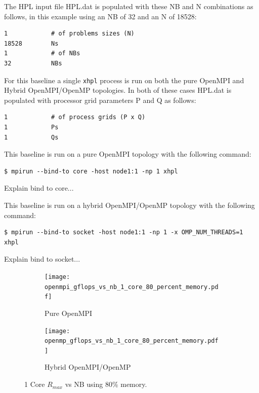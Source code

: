 \documentclass{report}
\begin{document}
The HPL input file HPL.dat is populated with these NB and N combinations as follows, in this example using an NB of 32 and an N of 18528: 

\lstset{style=listing}
\begin{lstlisting}[numbers=none]
1            # of problems sizes (N)
18528        Ns
1            # of NBs
32           NBs
\end{lstlisting}

For this baseline a single \verb|xhpl| process is run on both the pure OpenMPI and Hybrid OpenMPI/OpenMP topologies. In both of these cases HPL.dat is populated with processor grid parameters P and Q as follows:

\lstset{style=listing}
\begin{lstlisting}[numbers=none]
1            # of process grids (P x Q)
1            Ps
1            Qs
\end{lstlisting}

This baseline is run on a pure OpenMPI topology with the following command:

\lstset{style=type}
\begin{lstlisting}[]
$ mpirun --bind-to core -host node1:1 -np 1 xhpl
\end{lstlisting}

Explain bind to core...

This baseline is run on a hybrid OpenMPI/OpenMP topology with the following command:

\lstset{style=type}
\begin{lstlisting}[]
$ mpirun --bind-to socket -host node1:1 -np 1 -x OMP_NUM_THREADS=1 xhpl
\end{lstlisting}

Explain bind to socket...

\begin{figure}
	\begin{subfigure}{1.0\textwidth}
		\centering
		\texttt{[image: openmpi\_gflops\_vs\_nb\_1\_core\_80\_percent\_memory.pdf]}
		\caption{Pure OpenMPI}
		\label{fig:subim1}
	\end{subfigure}
	\par\bigskip
	\begin{subfigure}{1.0\textwidth}
		\centering
		\texttt{[image: openmp\_gflops\_vs\_nb\_1\_core\_80\_percent\_memory.pdf]}
		\caption{Hybrid OpenMPI/OpenMP}
		\label{fig:subim2}
	\end{subfigure}
\caption{1 Core $R_{max}$ vs NB using 80\% memory.}
\label{fig:image2}
\end{figure}
\end{document}
